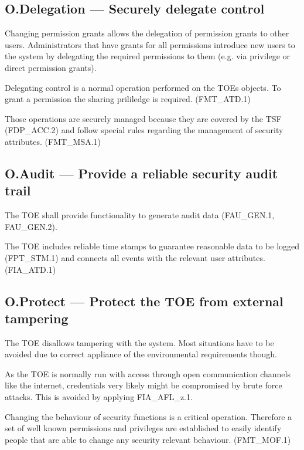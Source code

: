 \documentclass[12pt,english]{scrbook}
\begin{document}
\subsection{O.Delegation  --- Securely delegate control}

    Changing permission grants allows the delegation of permission
    grants to other users. Administrators that have grants for all
    permissions introduce new users to the system by delegating the required
    permissions to them (e.g. via privilege or direct permission grants).

    Delegating control is a normal operation performed on the TOEs objects. To
    grant a permission the sharing prililedge is required. (FMT\_ATD.1)

    Those operations are securely managed because they are covered by the TSF
    (FDP\_ACC.2) and follow special rules regarding the management of security
    attributes. (FMT\_MSA.1)

\subsection{O.Audit --- Provide a reliable security audit trail}

    The TOE shall provide functionality to generate audit data (FAU\_GEN.1,
    FAU\_GEN.2).

    The TOE includes reliable time stamps to guarantee reasonable data to be
    logged (FPT\_STM.1) and connects all events with the relevant user
    attributes. (FIA\_ATD.1)

\subsection{O.Protect --- Protect the TOE from external tampering}

    The TOE disallows tampering with the system. Most situations have to be
    avoided due to correct appliance of the environmental requirements though.

    As the TOE is normally run with access through open communication channels
    like the internet, credentials very likely might be compromised by brute
    force attacks. This is avoided by applying FIA\_AFL\_z.1.

    Changing the behaviour of security functions is a critical operation.
    Therefore a set of well known permissions and privileges are established to
    easily identify people that are able to change any security relevant
    behaviour. (FMT\_MOF.1)
    
\end{document}
